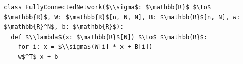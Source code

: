 \documentclass[border=10pt]{standalone}
\begin{document}
\begin{lstlisting}
class FullyConnectedNetwork($\\sigma$: $\mathbb{R}$ $\to$ $\mathbb{R}$, W: $\mathbb{R}$[n, N, N], B: $\mathbb{R}$[n, N], w: $\mathbb{R}^N$, b: $\mathbb{R}$):
  def $\\lambda$(x: $\mathbb{R}$[N]) $\to$ $\mathbb{R}$:
    for i: x = $\\sigma$(W[i] * x + B[i])
    w$^T$ x + b
\end{lstlisting}
\end{document}
